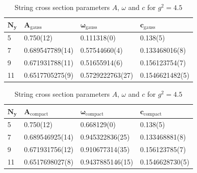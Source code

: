 \begin{table}[!hb]
\centering
\begin{tabular}{llll}
    $\mathbf{N_y}$ & $\mathbf{A_\mathrm{gauss}}$ & $\mathbf{\omega_\mathrm{gauss}}$ & $\mathbf{c_\mathrm{gauss}}$ \\ \hline
   5 & 0.750(12) & 0.111318(0) & 0.138(5) \\
   7 & 0.689547789(14) & 0.57544660(4) & 0.133468016(8) \\
   9 & 0.671931788(11) & 0.51655914(6) & 0.156123754(7) \\
   11 & 0.6517705275(9) & 0.5729222763(27) & 0.1546621482(5) \\
\end{tabular}
\begin{tabular}{llll}
    $\mathbf{N_y}$ & $\mathbf{A_\mathrm{compact}}$ & $\mathbf{\omega_\mathrm{compact}}$ & $\mathbf{c_\mathrm{compact}}$ \\ \hline
   5 & 0.750(12) & 0.668129(0) & 0.138(5) \\
   7 & 0.689546925(14) & 0.945322836(25) & 0.133468881(8) \\
   9 & 0.671931756(12) & 0.910677314(35) & 0.156123785(7) \\
   11 & 0.6517698027(8) & 0.9437885146(15) & 0.1546628730(5) \\
\end{tabular}
\caption{String cross section parameters $A$, $\omega$ and $c$ for $g^2=4.5$}
\end{table}
